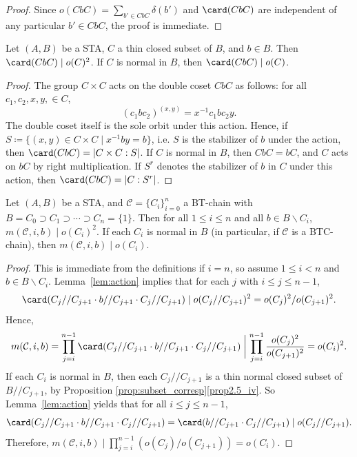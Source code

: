 \begin{proof}
Since $o(CbC) = \sum_{b' \in CbC}\delta(b')$ and $\card(CbC)$ are
independent of any particular $b' \in CbC$, the proof is immediate.
\end{proof}

\begin{lemm}
\label{lem:action}
Let $(A, B)$ be a STA, $C$ a thin closed subset of $B$, and $b \in B$.
Then $\card (CbC) \mid o(C)^2$. If $C$ is normal in $B$, then
$\card(CbC) \mid o(C)$.
\end{lemm}

\begin{proof}
The group $C\times C$ acts on the double coset $CbC$ as follows: for
all $c_1, c_2, x, y, \in C$,
\[
(c_1bc_2)^{(x, y)} = x^{-1}c_1bc_2y.
\]
The double coset itself is the sole orbit under this action. Hence, if
$S \coloneqq \{(x, y) \in C\times C \mid x^{-1}by = b\}$, i.e. $S$ is the
stabilizer of $b$ under the action, then $\card (CbC) = |C\times C
: S|$. If $C$ is normal in $B$, then $CbC = bC$, and $C$ acts on $bC$ by
right multiplication. If $S^r$ denotes the stabilizer of $b$ in $C$
under this action, then $\card (CbC) = |C : S^r|$.
\end{proof}
 
\begin{lemm}
\label{lem:m_sq}
Let $(A, B)$ be a STA, and $\mathcal{C} = \{C_i\}_{i=0}^n$ a BT-chain
with $B = C_0 \supset C_1 \supset \cdots \supset C_n = \{1\}$. Then for
all $1 \leq i \leq n$ and all $b \in B\backslash C_i$, $m(\mathcal{C},
i, b) \mid o(C_i)^2$. If each $C_i$ is normal in $B$ \textup{(}in
particular, if $\mathcal{C}$ is a BTC-chain\textup{)}, then $m(\mathcal{C}, i, b)
\mid o(C_i)$.
\end{lemm}

\begin{proof}
This is immediate from the definitions if $i = n$, so assume $1 \leq i
< n$ and $b \in B\backslash C_i$. Lemma~\ref{lem:action} implies that
for each $j$ with $i \leq j \leq n-1$, 
\[
 \card (C_j//C_{j+1}\cdot b//C_{j+1}\cdot C_j//C_{j+1}) \mid
o(C_j//C_{j+1})^2 = o(C_j)^2/o(C_{j+1})^2.
\]
Hence,
\[
m(\mathcal{C}, i, b) = \prod_{j=i}^{n-1}\card (C_j//C_{j+1}\cdot
b//C_{j+1}\cdot C_j//C_{j+1}) \mathrel{\bigg|}
\prod_{j=i}^{n-1}\frac{o(C_j)^2}{o(C_{j+1})^2} = o(C_i)^2.
\]
If each $C_i$ is normal in $B$, then each $C_j//C_{j+1}$ is a thin
normal closed subset of $B//C_{j+1}$, by Proposition
\ref{prop:subset_corresp}\ref{prop2.5_iv}. So Lemma~\ref{lem:action} yields that 
for all $i \leq j \leq n-1$, 
\[
\card (C_j//C_{j+1}\cdot b//C_{j+1}\cdot C_j//C_{j+1}) =
\card (b//C_{j+1}\cdot C_j//C_{j+1}) \mid o(C_j//C_{j+1}).
\]
Therefore, $m(\mathcal{C}, i, b) \mid
\prod_{j=i}^{n-1}(o(C_j)/o(C_{j+1})) = o(C_i)$.
\end{proof}


